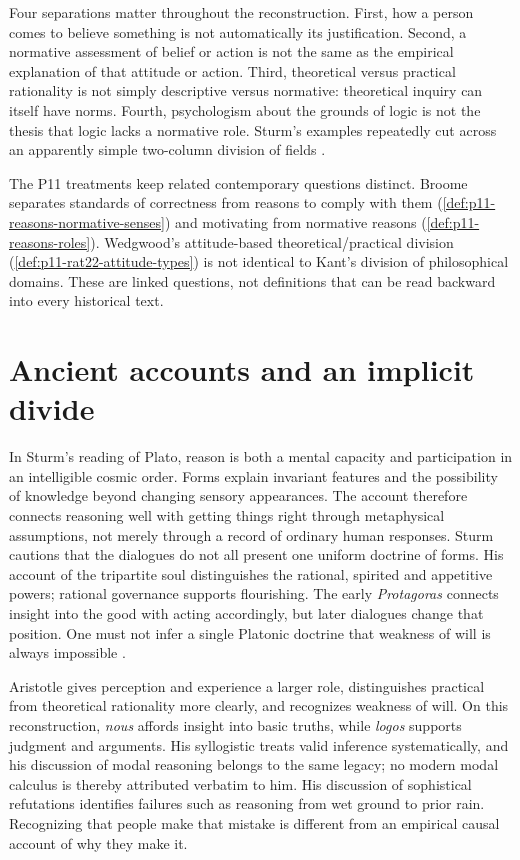 Four separations matter throughout the reconstruction. First, how a
person comes to believe something is not automatically its justification.
Second, a normative assessment of belief or action is not the same as
the empirical explanation of that attitude or action. Third, theoretical
versus practical rationality is not simply descriptive versus normative:
theoretical inquiry can itself have norms. Fourth, psychologism about the
grounds of logic is not the thesis that logic lacks a normative role.
Sturm's examples repeatedly cut across an apparently simple two-column
division of fields \parencite[pp.~71, 78--82]{Sturm2021DescriptiveNormativeHistory}.

The P11 treatments keep related contemporary questions distinct.
Broome separates standards of correctness from reasons to comply with
them (\cref{def:p11-reasons-normative-senses}) and motivating from
normative reasons (\cref{def:p11-reasons-roles}). Wedgwood's
attitude-based theoretical/practical division
(\cref{def:p11-rat22-attitude-types}) is not identical to Kant's
division of philosophical domains. These are linked questions, not
definitions that can be read backward into every historical text.

\section{Ancient accounts and an implicit divide}
\label{sec:p13-r11-antiquity}

In Sturm's reading of Plato, reason is both a mental capacity and
participation in an intelligible cosmic order. Forms explain invariant
features and the possibility of knowledge beyond changing sensory
appearances. The account therefore connects reasoning well with getting
things right through metaphysical assumptions, not merely through a
record of ordinary human responses. Sturm cautions that the dialogues
do not all present one uniform doctrine of forms. His account of the
tripartite soul distinguishes the rational, spirited and appetitive
powers; rational governance supports flourishing. The early
\emph{Protagoras} connects insight into the good with acting accordingly,
but later dialogues change that position. One must not infer a single
Platonic doctrine that weakness of will is always impossible
\parencite[pp.~71--72 and p.~82, nn.~2--3]{Sturm2021DescriptiveNormativeHistory}.

Aristotle gives perception and experience a larger role, distinguishes
practical from theoretical rationality more clearly, and recognizes
weakness of will. On this reconstruction, \emph{nous} affords insight
into basic truths, while \emph{logos} supports judgment and arguments.
His syllogistic treats valid inference systematically, and his discussion
of modal reasoning belongs to the same legacy; no modern modal calculus
is thereby attributed verbatim to him. His discussion
of sophistical refutations identifies failures such as reasoning from
wet ground to prior rain. Recognizing that people make that mistake is
different from an empirical causal account of why they make it.

